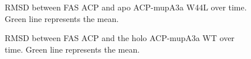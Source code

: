 \begin{singlespacing}
		\setlength\fboxsep{5pt}
		\setlength\fboxrule{1.5pt}
		\begin{figure}[htbp]
		\centering
		\caption[RMSD between FAS ACP and apo ACP-mupA3a W44L over time.]{RMSD between FAS ACP and apo ACP-mupA3a W44L over time. Green line represents the mean.}
		\label{fig:RmsdAcpMutant}
		\end{figure}	

		\setlength\fboxsep{5pt}
		\setlength\fboxrule{1.5pt}
		\begin{figure}[htbp]
		\centering
		\caption[RMSD between FAS ACP and the holo ACP-mupA3a WT over time.]{RMSD between FAS ACP and the holo ACP-mupA3a WT over time. Green line represents the mean.}
		\label{fig:RmsdAcpPPTWild}
		\end{figure}


\end{singlespacing}
